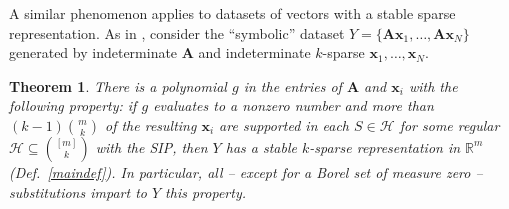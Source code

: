 \documentclass[9pt,twocolumn]{pnas-new}
\newtheorem{theorem}{Theorem}
\renewcommand{\eqref}[1]{\textnormal{[\ref{#1}]}}
\begin{document}
%


A similar phenomenon applies to datasets of vectors with a stable sparse representation. As in \cite[Sec.~IV]{Hillar15}, consider the ``symbolic'' dataset $Y = \{\mathbf{A}\mathbf{x}_1,\ldots,\mathbf{A} \mathbf{x}_N\}$ generated by indeterminate $\mathbf{A}$ and indeterminate $k$-sparse $\mathbf{x}_1, \ldots, \mathbf{x}_N$.  

\begin{theorem}\label{robustPolythm}
There is a polynomial $g$ in the entries of $\mathbf{A}$ and $\mathbf{x}_i$ with the following property:  if $g$ evaluates to a nonzero number and more than \mbox{$(k-1){m \choose k}$} of the resulting $\mathbf{x}_i$ are supported in each $S \in \mathcal{H}$ for some regular $\mathcal{H} \subseteq {[m] \choose k}$ with the SIP, then $Y$ has a stable $k$-sparse representation in $\mathbb{R}^m$ (Def.~\ref{maindef}). In particular, all -- except for a Borel set of measure zero -- substitutions impart to $Y$ this property.
\end{theorem}
\end{document}
